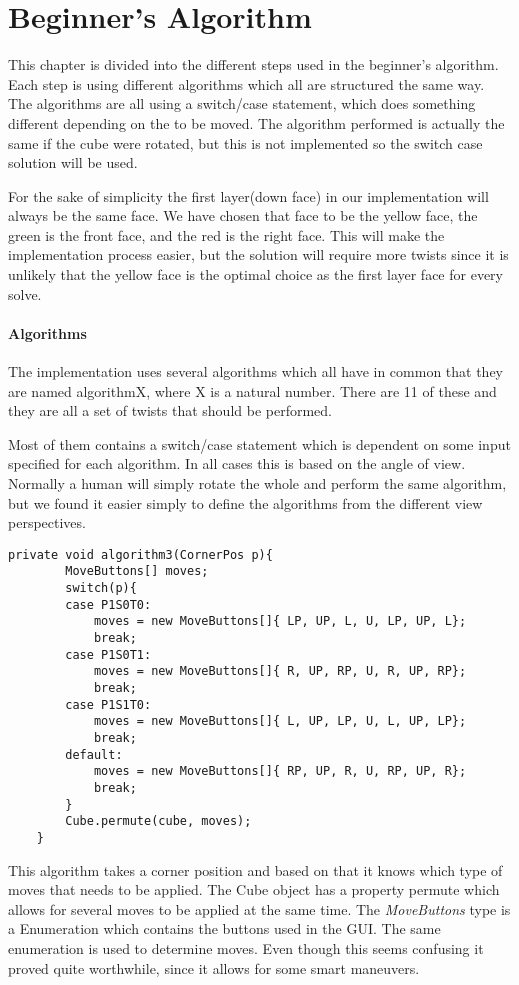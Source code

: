 \chapter{Beginner's Algorithm}

This chapter is divided into the different steps used in the beginner's algorithm.
Each step is using different algorithms which all are structured the same way. The algorithms are all using a switch/case statement, which does something different depending on the \cpiece{} to be moved. The algorithm performed is actually the same if the cube were rotated, but this is not implemented so the switch case solution will be used.

For the sake of simplicity the first layer(down face) in our implementation will always be the same face. We have chosen that face to be the yellow face, the green is the front face, and the red is the right face. This will make the implementation process easier, but the solution will require more twists since it is unlikely that the yellow face is the optimal choice as the first layer face for every solve.

\subsubsection{Algorithms}
The implementation uses several algorithms which all have in common that they are named algorithmX, where X is a natural number. There are 11 of these and they are all a set of twists that should be performed. 

Most of them contains a switch/case statement which is dependent on some input specified for each algorithm. In all cases this is based on the angle of view. Normally a human will simply rotate the whole \cube{} and perform the same algorithm, but we found it easier simply to define the algorithms from the different view perspectives. 
\begin{verbatim}
private void algorithm3(CornerPos p){
		MoveButtons[] moves;
		switch(p){
		case P1S0T0:
			moves = new MoveButtons[]{ LP, UP, L, U, LP, UP, L};
			break;
		case P1S0T1:
			moves = new MoveButtons[]{ R, UP, RP, U, R, UP, RP};
			break;
		case P1S1T0:
			moves = new MoveButtons[]{ L, UP, LP, U, L, UP, LP};
			break;
		default:
			moves = new MoveButtons[]{ RP, UP, R, U, RP, UP, R};
			break;
		}
		Cube.permute(cube, moves);
	}
\end{verbatim}
This algorithm takes a corner position and based on that it knows which type of moves that needs to be applied. The Cube object has a property permute which allows for several moves to be applied at the same time. The \textit{MoveButtons} type is a Enumeration which contains the buttons used in the GUI. The same enumeration is used to determine moves. Even though this seems confusing it proved quite worthwhile, since it allows for some smart maneuvers. 

